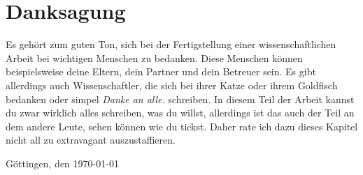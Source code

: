 

\section*{Danksagung}

Es gehört zum guten Ton, sich bei der Fertigstellung einer wissenschaftlichen Arbeit bei wichtigen Menschen zu bedanken. Diese Menschen können beispielsweise deine Eltern, dein Partner und dein Betreuer sein. Es gibt allerdings auch Wissenschaftler, die sich bei ihrer Katze oder ihrem Goldfisch bedanken oder simpel \textit{Danke an alle.} schreiben. In diesem Teil der Arbeit kannst du zwar wirklich alles schreiben, was du willst, allerdings ist das auch der Teil an dem andere Leute, sehen können wie du tickst. Daher rate ich dazu dieses Kapitel nicht all zu extravagant auszustaffieren.
\vspace{3em}

Göttingen, den \today
